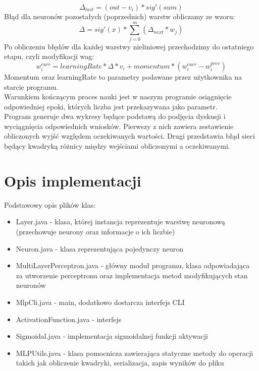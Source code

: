 \documentclass{classrep}
\begin{document}
{{\begin{equation}
\Delta_{last} = (out - v_i) * sig'(sum)
\end{equation}
Błąd dla neuronów pozostałych (poprzednich) warstw obliczamy ze wzoru:
\begin{equation}
\Delta = sig'(x) * \sum_{j=0}^{m} (\Delta_{next} * w_{j})
\end{equation}
Po obliczeniu błędów dla każdej warstwy nieliniowej przechodzimy do ostatniego etapu, czyli modyfikacji wag:
\begin{equation}
w_{i}^{curr} = learningRate * \Delta * v_{i} + momentum * (w_{i}^{curr} - w_{i}^{prev})
\end{equation}
Momentum oraz learningRate to parametry podawane przez użytkownika na starcie programu.
\\
Warunkiem kończącym proces nauki jest w naszym programie osiągnięcie odpowiedniej epoki, których liczba jest przekazywana jako parametr.
\\
Program generuje dwa wykresy będące podstawą do podjęcia dyskusji i wyciągnięcia odpowiednich wniosków. Pierwszy z nich zawiera zestawienie obliczonych wyjść względem oczekiwanych wartości. Drugi przedstawia błąd sieci będący kwadryką różnicy między wejściami obliczonymi a oczekiwanymi.
}

\section{Opis implementacji}
Podstawowy opis plików klas:
\begin{itemize}
	\item Layer.java - klasa, której instancja reprezentuje warstwę neuronową (przechowuje neurony oraz informacje o ich liczbie)
	\item Neuron.java - klasa reprezentująca pojedynczy neuron 
	\item MultiLayerPerceptron.java - główny moduł programu, klasa odpowiadająca za utworzenie perceptronu oraz implementacja metod modyfikujących stan neuronów
	\item MlpCli.java - main, dodatkowo dostarcza interfejs CLI
	\item ActivationFunction.java - interfejs 	
	\item Sigmoidal.java - implementacja sigmoidalnej funkcji aktywacji
	\item MLPUtils.java - klasa pomocnicza zawierająca statyczne metody do operacji takich jak obliczenie kwadryki, serializacja, zapis wyników do pliku
\\


\end{itemize}}
\end{document}

